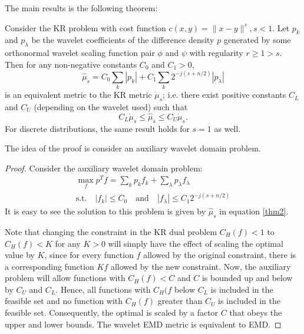 \documentclass[12pt, reqno]{amsart}
\begin{document}
The main results is the following theorem:
\begin{theorem}
	Consider the KR problem with cost function $c(x,y)=\|x-y\|^s, s<1$. Let $p_k$ and $p_\lambda$ be the wavelet coefficients of the difference density $p$ generated by some orthonormal wavelet  scaling function pair $\phi$ and $\psi$ with regularity $r \geq 1 > s$. Then for any non-negative constants $C_0$ and $C_1 >0$, 
\begin{equation}
\label{thm2}
	\hat{\mu}_s =C_0\sum_k{|p_k|}  + C_1 \sum_{k} 2^{-j(s+n/2)}|p_\lambda|
\end{equation}
is an equivalent metric to the KR metric $\dot{\mu}_s$; i.e. there exist positive constants $C_L$ and $C_U$ (depending on the wavelet used) such that 
\begin{equation}
	C_L \dot{\mu}_s \leq \hat{\mu}_s \leq C_U\dot{\mu}_s.
\end{equation}
For discrete distributions, the same result holds for $s=1$ as well.
\end{theorem}

The idea of the proof is consider an auxiliary wavelet domain problem.
\begin{proof}
Consider the auxiliary wavelet domain problem:
\begin{equation}
	\begin{aligned}
	\max_f p^Tf = \sum_{k} p_kf_k + \sum_{\lambda}p_\lambda f_\lambda \\
	\textrm{s.t.}\quad |f_k|\leq C_0 \quad\textrm{and}\quad |f_\lambda| \leq C_1 2^{-j(s+n/2)}
	\end{aligned}
\end{equation}
It is easy to see the solution to this problem is given by $\hat{\mu}_s$  in equation \eqref{thm2}. 


Note that changing the constraint in the KR dual problem $C_H(f) < 1$ to $C_H(f)< K$ for any $K>0$ will simply have the effect of scaling the optimal value by $K$, since for every function $f$ allowed by the original constraint, there is a corresponding function $Kf$ allowed by the new constraint. Now, the auxiliary problem will allow functions with $C_H(f) < C$ and $C$ is bounded up and below by $C_U$ and $C_L$. Hence, all functions with $C_H(f$ below $C_L$ is included in the feasible set and no function with $C_H(f)$ greater than $C_U$ is included in the feasible set.  Consequently, the optimal is scaled by a factor $C$ that obeys the upper and lower bounds. The wavelet EMD metric is equivalent to EMD.
\end{proof}
\end{document}
